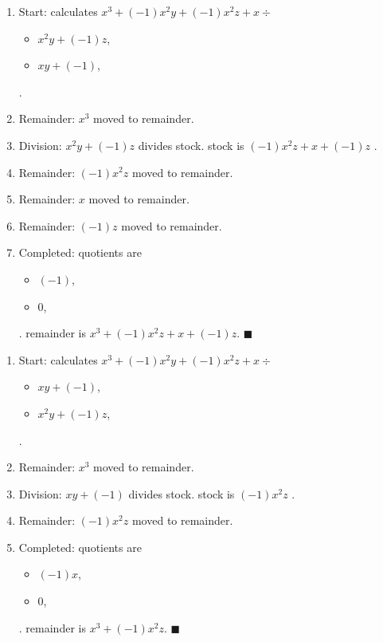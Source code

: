 \documentclass{jsarticle}
\begin{document}
\begin{enumerate}
\item Start: calculates $x^{3}+(-1)x^{2}y+(-1)x^{2}z+x\div $\begin{itemize}
\item $x^{2}y+(-1)z$, 
\item $xy+(-1)$, 
\end{itemize} .  

\item Remainder: $x^{3}$ moved to remainder.  
\item Division: $x^{2}y+(-1)z$ divides stock. stock is $(-1)x^{2}z+x+(-1)z$ .  
\item Remainder: $(-1)x^{2}z$ moved to remainder.  
\item Remainder: $x$ moved to remainder.  
\item Remainder: $(-1)z$ moved to remainder.  
\item Completed: quotients are \begin{itemize}
\item $(-1)$, 
\item $0$, 
\end{itemize} .  
remainder is $x^{3}+(-1)x^{2}z+x+(-1)z$.  $\blacksquare$
\end{enumerate}
\begin{enumerate}
\item Start: calculates $x^{3}+(-1)x^{2}y+(-1)x^{2}z+x\div $\begin{itemize}
\item $xy+(-1)$, 
\item $x^{2}y+(-1)z$, 
\end{itemize} .  

\item Remainder: $x^{3}$ moved to remainder.  
\item Division: $xy+(-1)$ divides stock. stock is $(-1)x^{2}z$ .  
\item Remainder: $(-1)x^{2}z$ moved to remainder.  
\item Completed: quotients are \begin{itemize}
\item $(-1)x$, 
\item $0$, 
\end{itemize} .  
remainder is $x^{3}+(-1)x^{2}z$.  $\blacksquare$
\end{enumerate}
\end{document}
